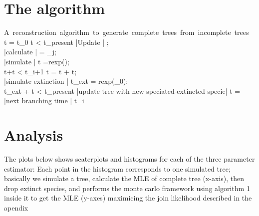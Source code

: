 \documentclass[10pt,a4paper]{article}
\begin{document}
\section{The algorithm}

\begin{program}
\mbox{A reconstruction algorithm to generate complete trees from incomplete trees}
\BEGIN \\ %
 t = t_0
 \WHILE t < t_{present} \DO
  |Update | \lambda;\\
  |calculate | \sigma = \sum \lambda_j;\\
  |simulate | \Delta t =rexp(\sigma); \\
  \IF t+\Delta t < t_{i+1} \THEN
   t = t + \Delta t;\\
   |simulate extinction | t_{ext} = rexp(\mu_0);\\
   \IF t_{ext} + t < t_{present} \THEN
    |update tree with new speciated-extincted specie|
   \FI
  \FI
 t = |next branching time | t_{i} 
 \OD	 
\END
\end{program}


\section{Analysis}

The plots below shows scaterplots and histograms for each of the three parameter estimator: Each point in the histogram corresponds to one simulated tree; basically we simulate a tree, calculate the MLE of complete tree (x-axis), then drop extinct species, and performs the monte carlo framework using algorithm 1 inside it to get the MLE (y-axes) maximicing the join likelihood described in the apendix 

\end{document}
